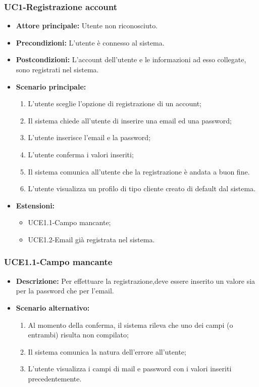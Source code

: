 \subsubsection{UC1-Registrazione account}
\begin{itemize}
    \item \textbf{Attore principale: }Utente non riconosciuto.
    \item \textbf{Precondizioni: }L'utente è connesso al sistema.
    \item \textbf{Postcondizioni: }L'account dell'utente e le informazioni ad esso collegate, sono registrati nel sistema.
    \item \textbf{Scenario principale:}
        \begin{enumerate}
            \item L'utente sceglie l'opzione di registrazione di un account;
            \item Il sistema chiede all'utente di inserire una email ed una password;
            \item L'utente inserisce l'email e la password;
            \item L'utente conferma i valori inseriti;
            \item Il sistema comunica all'utente che la registrazione è andata a buon fine.
            \item L'utente visualizza un profilo di tipo cliente creato di default dal sistema.
        \end{enumerate}
    \item \textbf{Estensioni:}
        \begin{itemize}
                \item UCE1.1-Campo mancante;
                \item UCE1.2-Email già registrata nel sistema.
        \end{itemize}
\end{itemize}

\subsubsection{UCE1.1-Campo mancante}
\begin{itemize}
    \item \textbf{Descrizione: }Per effettuare la registrazione,deve essere inserito un valore sia per la password che per l'email.
    \item \textbf{Scenario alternativo:}
    \begin{enumerate}
        \item Al momento della conferma, il sistema rileva che uno dei campi (o entrambi) risulta non compilato;
        \item Il sistema comunica la natura dell'errore all'utente;
        \item L'utente visualizza i campi di mail e password con i valori inseriti precedentemente.
    \end{enumerate}
\end{itemize}

